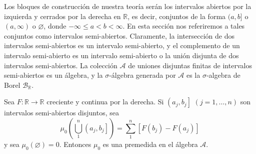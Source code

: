 Los bloques de construcción de nuestra teoría serán los intervalos abiertos por la izquierda y cerrados por la derecha en $\mathbb{R}$, es decir, conjuntos de la forma $(a, b]$ o $(a, \infty)$ o $\varnothing$, donde $-\infty \leq a<b<\infty$. En esta sección nos referiremos a tales conjuntos como intervalos semi-abiertos. Claramente, la intersección de dos intervalos semi-abiertos es un intervalo semi-abierto, y el complemento de un intervalo semi-abierto es un intervalo semi-abierto o la unión disjunta de dos intervalos semi-abiertos. La colección $\mathcal{A}$ de uniones disjuntas finitas de intervalos semi-abiertos es un álgebra, y la $\sigma$-álgebra generada por $\mathcal{A}$ es la $\sigma$-algebra de Borel  $\mathcal{B}_{\mathbb{R}}$.


\begin{proposicion}{}
 Sea $F: \mathbb{R} \rightarrow \mathbb{R}$ creciente y continua por la derecha. Si $\left(a_{j}, b_{j}\right]$ $(j=1, \ldots, n)$ son intervalos semi-abiertos disjuntos, sea
$$
\mu_{0}\left(\bigcup_{1}^{n}\left(a_{j}, b_{j}\right]\right)=\sum_{1}^{n}\left[F\left(b_{j}\right)-F\left(a_{j}\right)\right]
$$
y sea $\mu_{0}(\varnothing)=0$. Entonces $\mu_{0}$ es una premedida en el álgebra $\mathcal{A} .$
\end{proposicion}

